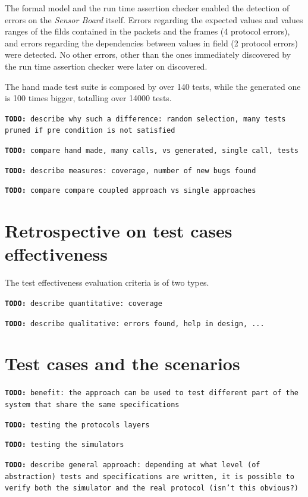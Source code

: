 \documentclass{article} \usepackage{times}
\newcommand{\todo}[1]{\texttt{\textbf{TODO:} #1}}
\newcommand{\SB}{\emph{Sensor Board}\xspace}
\begin{document}
The formal model and the run time assertion checker enabled the
detection of errors on the \SB itself.  Errors regarding the expected
values and values ranges of the filds contained in the packets and the
frames (4 protocol errors), and errors regarding the dependencies
between values in field (2 protocol errors) were detected. No other
errors, other than the ones immediately discovered by the run time
assertion checker were later on discovered.

The hand made test suite is composed by over 140 tests, while the
generated one is 100 times bigger, totalling over 14000 tests.

\todo{describe why such a difference: random selection, many tests 
pruned if pre condition is not satisfied}

\todo{compare hand made, many calls, vs generated, single call, tests}

\todo{describe measures: coverage, number of new bugs found}

\todo{compare compare coupled approach vs single approaches}



\section{Retrospective on test cases effectiveness}
\label{sec:test_cases_retrospectives}

The test effectiveness evaluation criteria is of two types. 

\todo{describe quantitative: coverage}

\todo{describe qualitative: errors found, help in design, ...}

\section{Test cases and the scenarios}
\label{sec:test_cases_and_the_scenarios}

\todo{benefit: the approach can be used to test different part of the system
that share the same specifications}

\todo{testing the protocols layers}

\todo{testing the simulators}

\todo{describe general approach: depending at what level (of abstraction) tests 
and specifications are written, it is possible to verify both the simulator and 
the real protocol (isn't this obvious?)}
\end{document}

